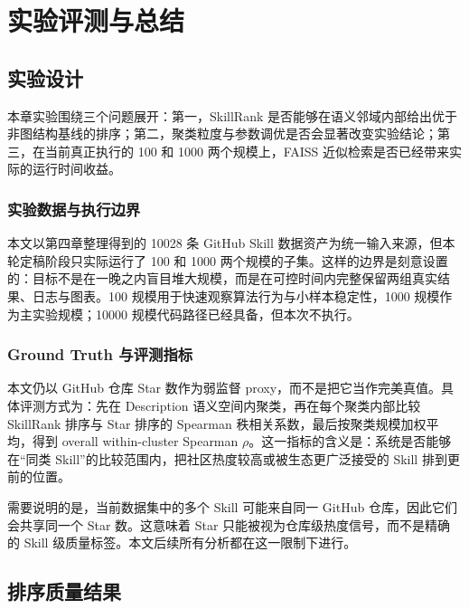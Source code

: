 
\chapter{实验评测与总结}
\label{cha:experiment}

\section{实验设计}
\label{sec:exp_design}

本章实验围绕三个问题展开：第一，SkillRank 是否能够在语义邻域内部给出优于非图结构基线的排序；第二，聚类粒度与参数调优是否会显著改变实验结论；第三，在当前真正执行的 100 和 1000 两个规模上，FAISS 近似检索是否已经带来实际的运行时间收益。

\subsection{实验数据与执行边界}

本文以第四章整理得到的 10028 条 GitHub Skill 数据资产为统一输入来源，但本轮定稿阶段只实际运行了 100 和 1000 两个规模的子集。这样的边界是刻意设置的：目标不是在一晚之内盲目堆大规模，而是在可控时间内完整保留两组真实结果、日志与图表。100 规模用于快速观察算法行为与小样本稳定性，1000 规模作为主实验规模；10000 规模代码路径已经具备，但本次不执行。

\subsection{Ground Truth 与评测指标}

本文仍以 GitHub 仓库 Star 数作为弱监督 proxy，而不是把它当作完美真值。具体评测方式为：先在 Description 语义空间内聚类，再在每个聚类内部比较 SkillRank 排序与 Star 排序的 Spearman 秩相关系数，最后按聚类规模加权平均，得到 overall within-cluster Spearman $\rho$。这一指标的含义是：系统是否能够在“同类 Skill”的比较范围内，把社区热度较高或被生态更广泛接受的 Skill 排到更前的位置。

需要说明的是，当前数据集中的多个 Skill 可能来自同一 GitHub 仓库，因此它们会共享同一个 Star 数。这意味着 Star 只能被视为仓库级热度信号，而不是精确的 Skill 级质量标签。本文后续所有分析都在这一限制下进行。

\section{排序质量结果}
\label{sec:ranking_results}

